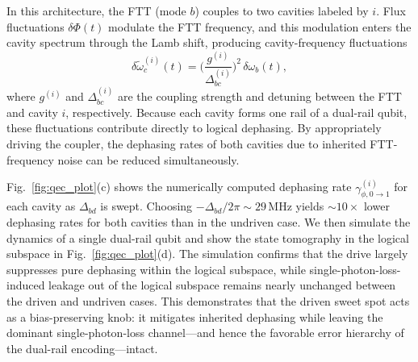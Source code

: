 In this architecture, the FTT (mode \(b\)) couples to two cavities labeled by \(i\). Flux fluctuations \(\delta\Phi(t)\) modulate the FTT frequency, and this modulation enters the cavity spectrum through the Lamb shift, producing cavity-frequency fluctuations
\begin{equation}
\delta \widetilde{\omega}^{(i)}_{c}(t)=\biggl(\frac{g^{(i)}}{\Delta^{(i)}_{bc}}\biggr)^2\,\delta\omega_b(t),
\end{equation}
where \(g^{(i)}\) and \(\Delta^{(i)}_{bc}\) are the coupling strength and detuning between the FTT and cavity \(i\), respectively. Because each cavity forms one rail of a dual-rail qubit, these fluctuations contribute directly to logical dephasing. By appropriately driving the coupler, the dephasing rates of both cavities due to inherited FTT-frequency noise can be reduced simultaneously.

Fig.~\ref{fig:qec_plot}(c) shows the numerically computed dephasing rate \(\gamma_{\phi,0\rightarrow 1}^{(i)}\) for each cavity as \(\Delta_{bd}\) is swept. Choosing \(-\Delta_{bd}/2\pi\sim 29\,\mathrm{MHz}\) yields \(\sim 10\times\) lower dephasing rates for both cavities than in the undriven case. We then simulate the dynamics of a single dual-rail qubit and show the state tomography in the logical subspace in Fig.~\ref{fig:qec_plot}(d). The simulation confirms that the drive largely suppresses pure dephasing within the logical subspace, while single-photon-loss-induced leakage out of the logical subspace remains nearly unchanged between the driven and undriven cases. This demonstrates that the driven sweet spot acts as a bias-preserving knob: it mitigates inherited dephasing while leaving the dominant single-photon-loss channel—and hence the favorable error hierarchy of the dual-rail encoding—intact.